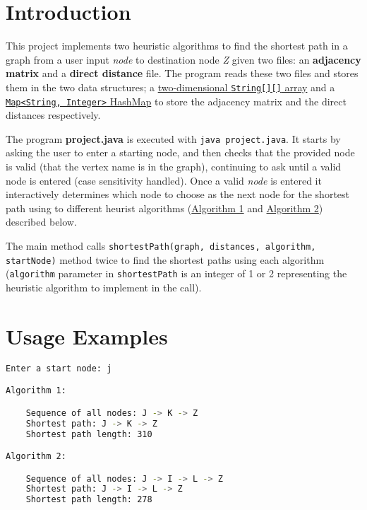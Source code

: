 \section*{Introduction}
This project implements two heuristic algorithms to find the shortest path in a graph from a user input \emph{node} to destination node \textit{Z} given two files: an \textbf{adjacency matrix} and a \textbf{direct distance} file. The program reads these two files and stores them in the two data structures; a \hyperlink{array}{two-dimensional \texttt{String[][]} array} and a \hyperlink{hashmap}{\texttt{Map<String, Integer>} HashMap} to store the adjacency matrix and the direct distances respectively.

The program \textbf{project.java} is executed with \texttt{java project.java}. It starts by asking the user to enter a starting node, and then checks that the provided node is valid (that the vertex name is in the graph), continuing to ask until a valid node is entered (case sensitivity handled). Once a valid \emph{node} is entered it interactively determines which node to choose as the next node for the shortest path using to different heurist algorithms (\hyperref[algo1]{Algorithm 1} and \hyperref[algo2]{Algorithm 2}) described below.

The main method calls \texttt{shortestPath(graph, distances, algorithm, startNode)} method twice to find the shortest paths using each algorithm (\texttt{algorithm} parameter in \texttt{shortestPath} is an integer of 1 or 2 representing the heuristic algorithm to implement in the call).

\pagebreak

\section*{Usage Examples}
\begin{lstlisting}[language=Bash]
Enter a start node: j

Algorithm 1:

    Sequence of all nodes: J -> K -> Z
    Shortest path: J -> K -> Z
    Shortest path length: 310

Algorithm 2:

    Sequence of all nodes: J -> I -> L -> Z
    Shortest path: J -> I -> L -> Z
    Shortest path length: 278

\end{lstlisting}

